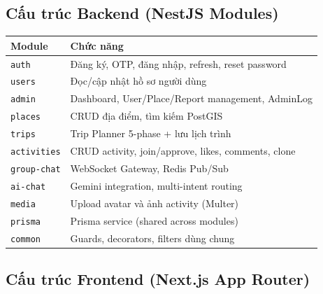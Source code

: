 \documentclass[12pt,a4paper]{article}
\begin{document}
\subsection{Cấu trúc Backend (NestJS Modules)}

\begin{center}
\begin{tabular}{ll}
  \toprule
  \textbf{Module} & \textbf{Chức năng} \\
  \midrule
  \texttt{auth}       & Đăng ký, OTP, đăng nhập, refresh, reset password \\
  \texttt{users}      & Đọc/cập nhật hồ sơ người dùng \\
  \texttt{admin}      & Dashboard, User/Place/Report management, AdminLog \\
  \texttt{places}     & CRUD địa điểm, tìm kiếm PostGIS \\
  \texttt{trips}      & Trip Planner 5-phase + lưu lịch trình \\
  \texttt{activities} & CRUD activity, join/approve, likes, comments, clone \\
  \texttt{group-chat} & WebSocket Gateway, Redis Pub/Sub \\
  \texttt{ai-chat}    & Gemini integration, multi-intent routing \\
  \texttt{media}      & Upload avatar và ảnh activity (Multer) \\
  \texttt{prisma}     & Prisma service (shared across modules) \\
  \texttt{common}     & Guards, decorators, filters dùng chung \\
  \bottomrule
\end{tabular}
\end{center}

\subsection{Cấu trúc Frontend (Next.js App Router)}
\end{document}
